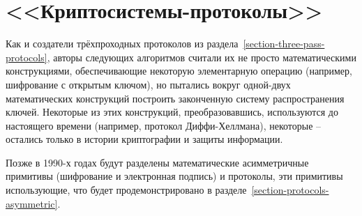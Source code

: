 \section{<<Криптосистемы-протоколы>>}\label{section-cryptosystems-protocols}

Как и создатели трёхпроходных протоколов из раздела~\ref{section-three-pass-protocols}, авторы следующих алгоритмов считали их не просто математическими конструкциями, обеспечивающие некоторую элементарную операцию (например, шифрование с открытым ключом), но пытались вокруг одной-двух математических конструкций построить законченную систему распространения ключей. Некоторые из этих конструкций, преобразовавшись, используются до настоящего времени (например, протокол Диффи-Хеллмана), некоторые -- остались только в истории криптографии и защиты информации.

Позже в 1990-х годах будут разделены математические асимметричные примитивы (шифрование и электронная подпись) и протоколы, эти примитивы использующие, что будет продемонстрировано в разделе~\ref{section-protocols-asymmetric}.








